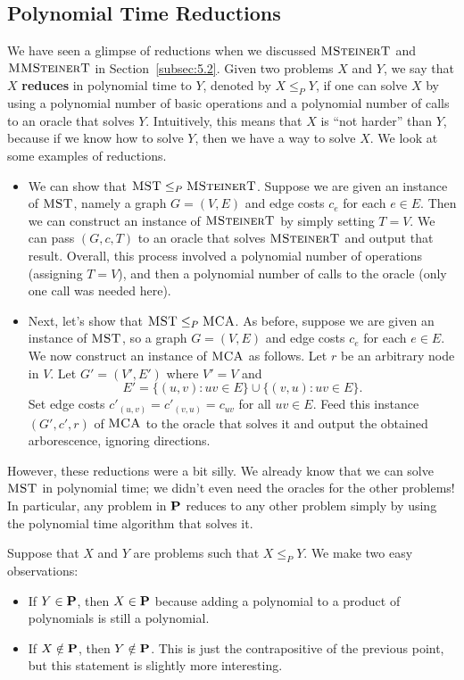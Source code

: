 \subsection{Polynomial Time Reductions} \label{subsec:6.2}
We have seen a glimpse of reductions when we discussed 
$\textsc{MSteinerT}$ and $\textsc{MMSteinerT}$ in Section~\ref{subsec:5.2}. 
Given two problems $X$ and $Y$, we say that $X$ {\bf reduces} in polynomial 
time to $Y$, denoted by $X \leq_P Y$, if one can solve $X$ by using a 
polynomial number of basic operations and a polynomial number of calls 
to an oracle that solves $Y$. Intuitively, this means that $X$ is ``not 
harder'' than $Y$, because if we know how to solve $Y$, then we have 
a way to solve $X$. We look at some examples of reductions.
\begin{itemize}
    \item We can show that $\textsc{MST} \leq_P \textsc{MSteinerT}$. 
    Suppose we are given an instance of $\textsc{MST}$, namely a graph 
    $G = (V, E)$ and edge costs $c_e$ for each $e \in E$. Then we can 
    construct an instance of $\textsc{MSteinerT}$ by simply setting 
    $T = V$. We can pass $(G, c, T)$ to an oracle that solves $\textsc{MSteinerT}$
    and output that result. 
    Overall, this process involved a polynomial number of operations 
    (assigning $T = V$), and then a polynomial number of calls to 
    the oracle (only one call was needed here).

    \item Next, let's show that $\textsc{MST} \leq_P \textsc{MCA}$. As before, 
    suppose we are given an instance of $\textsc{MST}$, so a graph $G = (V, E)$ 
    and edge costs $c_e$ for each $e \in E$. We now construct 
    an instance of $\textsc{MCA}$ as follows. Let $r$ be an 
    arbitrary node in $V$. Let $G' = (V', E')$ where 
    $V' = V$ and 
    \[ E' = \{(u, v) : uv \in E\} \cup \{(v, u) : uv \in E\}. \] 
    Set edge costs $c'_{(u,v)} = c'_{(v,u)} = c_{uv}$ for all $uv \in E$.
    Feed this instance $(G', c', r)$ of $\textsc{MCA}$ to the oracle that 
    solves it and output the obtained arborescence, ignoring directions.
\end{itemize}
However, these reductions were a bit silly. We already know that we can solve 
$\textsc{MST}$ in polynomial time; we didn't even need the oracles for the 
other problems! In particular, any problem in $\mathbf{P}$ reduces to 
any other problem simply by using the polynomial time algorithm that solves it.

Suppose that $X$ and $Y$ are problems such that $X \leq_P Y$. We make two 
easy observations: 
\begin{itemize}
    \item If $Y \in \mathbf{P}$, then $X \in \mathbf{P}$ because adding a polynomial 
    to a product of polynomials is still a polynomial. 
    \item If $X \notin \mathbf{P}$, then $Y \notin \mathbf{P}$. This is just the 
    contrapositive of the previous point, but this statement 
    is slightly more interesting. 
\end{itemize}

